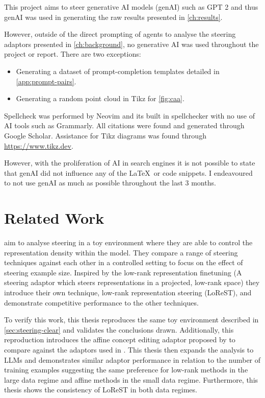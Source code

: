 This project aims to steer generative AI models (genAI) such as GPT 2 \citep{gpt-2} and thus genAI was used in generating the raw results presented in \cref{ch:results}.

However, outside of the direct prompting of agents to analyse the steering adaptors presented in \cref{ch:background}, no generative AI was used throughout the project or report.
There are two exceptions:
\begin{itemize}[nolistsep]
    \item Generating a dataset of prompt-completion templates detailed in \cref{app:prompt-pairs}.
    \item Generating a random point cloud in Tikz for \cref{fig:caa}.
\end{itemize}

Spellcheck was performed by Neovim and its built in spellchecker with no use of AI tools such as Grammarly.
All citations were found and generated through Google Scholar.
Assistance for Tikz diagrams was found through \href{https://www.tikz.dev}{https://www.tikz.dev}.

However, with the proliferation of AI in search engines it is not possible to state that genAI did not influence any of the \LaTeX~or code snippets.
I endeavoured to not use genAI as much as possible throughout the last 3 months.

\section{Related Work}

aim to analyse steering in a toy environment where they are able to control the representation density within the model.
They compare a range of steering techniques \citep{caa, reft, mimic} against each other in a controlled setting to focus on the effect of steering example size.
Inspired by the low-rank representation finetuning \citep[LoReFT]{reft} (A steering adaptor which steers representations in a projected, low-rank space) they introduce their own technique, low-rank representation steering (LoReST), and demonstrate competitive performance to the other techniques.

To verify this work, this thesis reproduces the same toy environment described in \cref{sec:steering-clear} and validates the conclusions drawn.
Additionally, this reproduction introduces the affine concept editing adaptor proposed by \citet{ace} to compare against the adaptors used in \citet{steering-clear}.
This thesis then expands the analysis to LLMs and demonstrates similar adaptor performance in relation to the number of training examples suggesting the same preference for low-rank methods in the large data regime and affine methods in the small data regime.
Furthermore, this thesis shows the consistency of LoReST in both data regimes.

